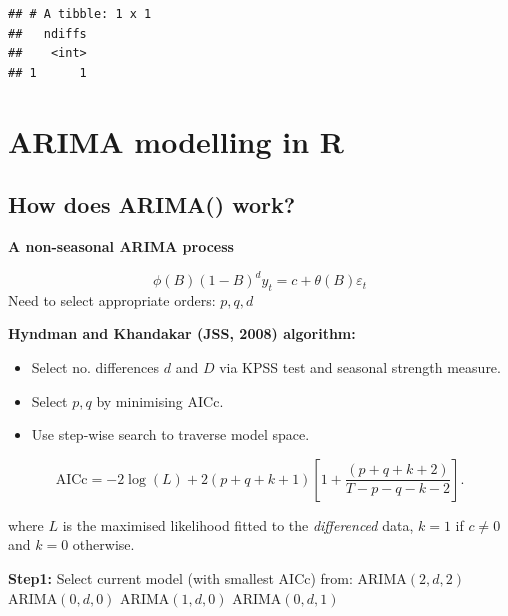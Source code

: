 \documentclass[]{book}
\newenvironment{Shaded}{\begin{snugshade}}{\end{snugshade}}
\newcommand{\DataTypeTok}[1]{\textcolor[rgb]{0.13,0.29,0.53}{#1}}
\newcommand{\DecValTok}[1]{\textcolor[rgb]{0.00,0.00,0.81}{#1}}
\newcommand{\KeywordTok}[1]{\textcolor[rgb]{0.13,0.29,0.53}{\textbf{#1}}}
\newcommand{\NormalTok}[1]{#1}
\newcommand{\OperatorTok}[1]{\textcolor[rgb]{0.81,0.36,0.00}{\textbf{#1}}}
\newcommand{\StringTok}[1]{\textcolor[rgb]{0.31,0.60,0.02}{#1}}
\providecommand{\tightlist}{%
  \setlength{\itemsep}{0pt}\setlength{\parskip}{0pt}}
\begin{document}
\begin{Shaded}
\end{Shaded}

\begin{verbatim}
## # A tibble: 1 x 1
##   ndiffs
##    <int>
## 1      1
\end{verbatim}

\hypertarget{arima-modelling-in-r}{%
\section{ARIMA modelling in R}\label{arima-modelling-in-r}}

\hypertarget{how-does-arima-work}{%
\subsection{How does ARIMA() work?}\label{how-does-arima-work}}

\textbf{A non-seasonal ARIMA process}

\[\phi(B)(1-B)^dy_{t} = c + \theta(B)\varepsilon_t\]
Need to select appropriate orders: \(p,q, d\)

\textbf{Hyndman and Khandakar (JSS, 2008) algorithm:}

\begin{itemize}
\tightlist
\item
  Select no. differences \(d\) and \(D\) via KPSS test and seasonal strength measure.
\item
  Select \(p,q\) by minimising AICc.
\item
  Use step-wise search to traverse model space.
\end{itemize}

\[\text{AICc} = -2 \log(L) + 2(p+q+k+1)\left[1 +
\frac{(p+q+k+2)}{T-p-q-k-2}\right].\]

where \(L\) is the maximised likelihood fitted to the \emph{differenced} data, \(k=1\) if \(c\neq 0\) and \(k=0\) otherwise.

\textbf{Step1:} Select current model (with smallest AICc) from:\newline
ARIMA\((2,d,2)\)\newline
ARIMA\((0,d,0)\)\newline
ARIMA\((1,d,0)\)\newline
ARIMA\((0,d,1)\)
\end{document}
